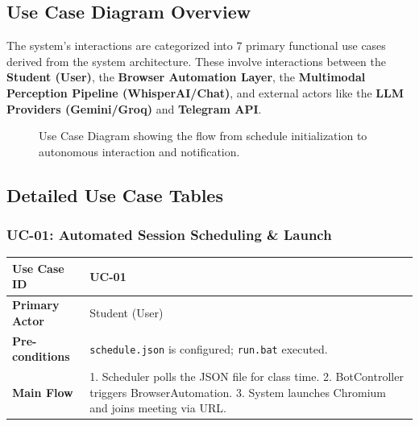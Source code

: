 \documentclass[12pt]{article}
\begin{document}
\subsection{Use Case Diagram Overview}
The system's interactions are categorized into 7 primary functional use cases derived from the system architecture. These involve interactions between the \textbf{Student (User)}, the \textbf{Browser Automation Layer}, the \textbf{Multimodal Perception Pipeline (WhisperAI/Chat)}, and external actors like the \textbf{LLM Providers (Gemini/Groq)} and \textbf{Telegram API}.

\vspace{1cm}
\begin{figure}[h!]
    \centering
    \caption{Use Case Diagram showing the flow from schedule initialization to autonomous interaction and notification.}
    \label{fig:use_case}
\end{figure}
\vspace{1cm}

\subsection{Detailed Use Case Tables}

\subsubsection{UC-01: Automated Session Scheduling \& Launch}
\begin{longtable}{|p{4cm}|p{10cm}|}
\hline
\textbf{Use Case ID} & UC-01 \\ \hline
\textbf{Primary Actor} & Student (User) \\ \hline
\textbf{Pre-conditions} & \texttt{schedule.json} is configured; \texttt{run.bat} executed. \\ \hline
\textbf{Main Flow} & 1. Scheduler polls the JSON file for class time. 2. BotController triggers BrowserAutomation. 3. System launches Chromium and joins meeting via URL. \\ \hline
\end{longtable}
\end{document}

